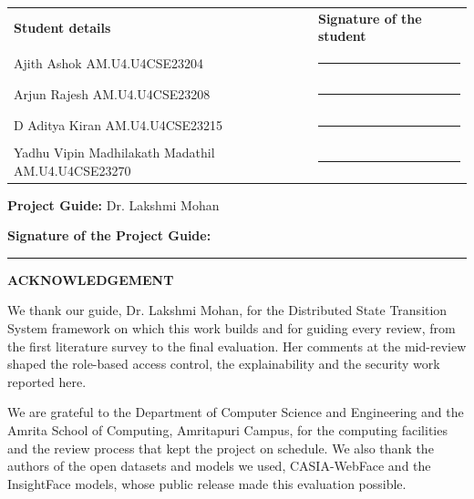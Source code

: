 \documentclass[12pt,a4paper,oneside]{report}
\begin{document}
\noindent
\begin{tabular}{@{}p{}p{}@{}}
\textbf{Student details} & \textbf{Signature of the student} \\[14pt]

Ajith Ashok\newline
AM.U4.U4CSE23204
& \rule{0.30\textwidth}{0.4pt} \\[18pt]

Arjun Rajesh\newline
AM.U4.U4CSE23208
& \rule{0.30\textwidth}{0.4pt} \\[18pt]

D Aditya Kiran\newline
AM.U4.U4CSE23215
& \rule{0.30\textwidth}{0.4pt} \\[18pt]

Yadhu Vipin Madhilakath Madathil\newline
AM.U4.U4CSE23270
& \rule{0.30\textwidth}{0.4pt}
\end{tabular}

\vspace{0.8cm}

\noindent
\textbf{Project Guide:} Dr. Lakshmi Mohan

\vspace{0.5cm}

\noindent
\textbf{Signature of the Project Guide:}
\rule{4cm}{0.4pt}

\clearpage

\clearpage
\clearpage
{}
\pagestyle{plain}

{}
{\centering \Large\bfseries ACKNOWLEDGEMENT\par}
We thank our guide, Dr. Lakshmi Mohan, for the Distributed State Transition System framework on which this work builds and for guiding every review, from the first literature survey to the final evaluation. Her comments at the mid-review shaped the role-based access control, the explainability and the security work reported here.

We are grateful to the Department of Computer Science and Engineering and the Amrita School of Computing, Amritapuri Campus, for the computing facilities and the review process that kept the project on schedule. We also thank the authors of the open datasets and models we used, CASIA-WebFace and the InsightFace models, whose public release made this evaluation possible.
\end{document}
